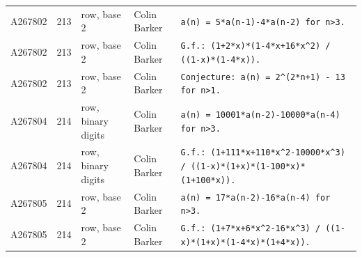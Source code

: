 \documentclass[11pt]{article}
\theoremstyle{definition}
\theoremstyle{remark}
\begin{document}
{\begin{longtable}{p{1.3cm}p{0.7cm}p{2.4cm}p{2.3cm}p{7.3cm}}
A267802 & 213 & row, base 2 & Colin Barker & \texttt{a(n)\allowbreak{} \allowbreak{}=\allowbreak{} \allowbreak{}5*\allowbreak{}a(n-\allowbreak{}1)\allowbreak{}-\allowbreak{}4*\allowbreak{}a(n-\allowbreak{}2)\allowbreak{} \allowbreak{}for \allowbreak{}n>3.} \\
A267802 & 213 & row, base 2 & Colin Barker & \texttt{G.f.: \allowbreak{}(1+\allowbreak{}2*\allowbreak{}x)\allowbreak{}*\allowbreak{}(1-\allowbreak{}4*\allowbreak{}x+\allowbreak{}16*\allowbreak{}x\^{}2)\allowbreak{} \allowbreak{}/\allowbreak{} \allowbreak{}((1-\allowbreak{}x)\allowbreak{}*\allowbreak{}(1-\allowbreak{}4*\allowbreak{}x)\allowbreak{})\allowbreak{}.} \\
A267802 & 213 & row, base 2 & Colin Barker & \texttt{Conjecture: \allowbreak{}a(n)\allowbreak{} \allowbreak{}=\allowbreak{} \allowbreak{}2\^{}(2*\allowbreak{}n+\allowbreak{}1)\allowbreak{} \allowbreak{}-\allowbreak{} \allowbreak{}13 \allowbreak{}for \allowbreak{}n>1.} \\
A267804 & 214 & row, binary digits & Colin Barker & \texttt{a(n)\allowbreak{} \allowbreak{}=\allowbreak{} \allowbreak{}10001*\allowbreak{}a(n-\allowbreak{}2)\allowbreak{}-\allowbreak{}10000*\allowbreak{}a(n-\allowbreak{}4)\allowbreak{} \allowbreak{}for \allowbreak{}n>3.} \\
A267804 & 214 & row, binary digits & Colin Barker & \texttt{G.f.: \allowbreak{}(1+\allowbreak{}111*\allowbreak{}x+\allowbreak{}110*\allowbreak{}x\^{}2-\allowbreak{}10000*\allowbreak{}x\^{}3)\allowbreak{} \allowbreak{}/\allowbreak{} \allowbreak{}((1-\allowbreak{}x)\allowbreak{}*\allowbreak{}(1+\allowbreak{}x)\allowbreak{}*\allowbreak{}(1-\allowbreak{}100*\allowbreak{}x)\allowbreak{}*\allowbreak{}(1+\allowbreak{}100*\allowbreak{}x)\allowbreak{})\allowbreak{}.} \\
A267805 & 214 & row, base 2 & Colin Barker & \texttt{a(n)\allowbreak{} \allowbreak{}=\allowbreak{} \allowbreak{}17*\allowbreak{}a(n-\allowbreak{}2)\allowbreak{}-\allowbreak{}16*\allowbreak{}a(n-\allowbreak{}4)\allowbreak{} \allowbreak{}for \allowbreak{}n>3.} \\
A267805 & 214 & row, base 2 & Colin Barker & \texttt{G.f.: \allowbreak{}(1+\allowbreak{}7*\allowbreak{}x+\allowbreak{}6*\allowbreak{}x\^{}2-\allowbreak{}16*\allowbreak{}x\^{}3)\allowbreak{} \allowbreak{}/\allowbreak{} \allowbreak{}((1-\allowbreak{}x)\allowbreak{}*\allowbreak{}(1+\allowbreak{}x)\allowbreak{}*\allowbreak{}(1-\allowbreak{}4*\allowbreak{}x)\allowbreak{}*\allowbreak{}(1+\allowbreak{}4*\allowbreak{}x)\allowbreak{})\allowbreak{}.} \\

\end{longtable}}
\end{document}
